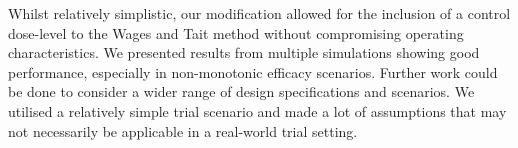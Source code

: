 Whilst relatively simplistic, our modification allowed for the inclusion of a control dose-level to the Wages and Tait method without compromising operating characteristics. We presented results from multiple simulations showing good performance, especially in non-monotonic efficacy scenarios. Further work could be done to consider a wider range of design specifications and scenarios. We utilised a relatively simple trial scenario and made a lot of assumptions that may not necessarily be applicable in a real-world trial setting.  

